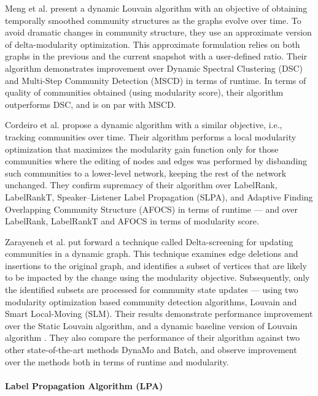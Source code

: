Meng et al. \cite{com-meng16} present a dynamic Louvain algorithm with an objective of obtaining temporally smoothed community structures as the graphs evolve over time. To avoid dramatic changes in community structure, they use an approximate version of delta-modularity optimization. This approximate formulation relies on both graphs in the previous and the current snapshot with a user-defined ratio. Their algorithm demonstrates improvement over Dynamic Spectral Clustering (DSC) and Multi-Step Community Detection (MSCD) in terms of runtime. In terms of quality of communities obtained (using modularity score), their algorithm outperforms DSC, and is on par with MSCD.

Cordeiro et al. \cite{com-cordeiro16} propose a dynamic algorithm with a similar objective, i.e., tracking communities over time. Their algorithm performs a local modularity optimization that maximizes the modularity gain function only for those communities where the editing of nodes and edges was performed by disbanding such communities to a lower-level network, keeping the rest of the network unchanged. They confirm supremacy of their algorithm over LabelRank, LabelRankT, Speaker–Listener Label Propagation (SLPA), and Adaptive Finding Overlapping Community Structure (AFOCS) in terms of runtime --- and over LabelRank, LabelRankT and AFOCS in terms of modularity score.

Zarayeneh et al. \cite{com-zarayeneh21} put forward a technique called Delta-screening for updating communities in a dynamic graph. This technique examines edge deletions and insertions to the original graph, and identifies a subset of vertices that are likely to be impacted by the change using the modularity objective. Subsequently, only the identified subsets are processed for community state updates --- using two modularity optimization based community detection algorithms, Louvain and Smart Local-Moving (SLM). Their results demonstrate performance improvement over the Static Louvain algorithm, and a dynamic baseline version of Louvain algorithm \cite{com-aynaud10}. They also compare the performance of their algorithm against two other state-of-the-art methods DynaMo and Batch, and observe improvement over the methods both in terms of runtime and modularity.




\paragraph{Label Propagation Algorithm (LPA) \cite{com-raghavan07}}

